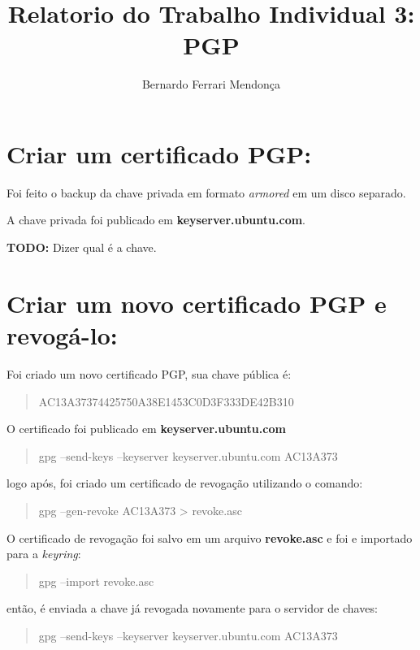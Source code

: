 \documentclass[12pt]{article}
\title{Relatorio do Trabalho Individual 3: PGP}
\author{Bernardo Ferrari Mendonça}
\begin{document}
\section{Criar um certificado PGP:}

Foi feito o backup da chave privada em formato \textit{armored} em um disco separado.

A chave privada foi publicado em \textbf{keyserver.ubuntu.com}.

\textbf{TODO:} Dizer qual é a chave.

\section{Criar um novo certificado PGP e revogá-lo:}

Foi criado um novo certificado PGP, sua chave pública é:

\begin{quote}
  AC13A37374425750A38E1453C0D3F333DE42B310
\end{quote}

O certificado foi publicado em \textbf{keyserver.ubuntu.com}
\begin{quote}
  gpg --send-keys --keyserver keyserver.ubuntu.com AC13A373
\end{quote}
logo após, foi criado um certificado de revogação utilizando o comando:

\begin{quote}
  gpg --gen-revoke AC13A373 \textgreater{} revoke.asc
\end{quote}

O certificado de revogação foi salvo em um arquivo \textbf{revoke.asc}
e foi e importado para a \textit{keyring}:
\begin{quote}
  gpg --import revoke.asc
\end{quote}
então, é enviada a chave já revogada novamente para o servidor de chaves:
\begin{quote}
  gpg --send-keys --keyserver keyserver.ubuntu.com AC13A373
\end{quote}
\end{document}
